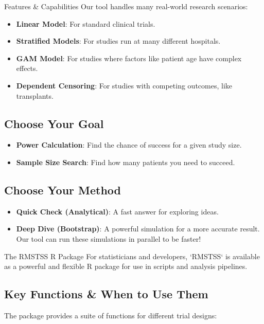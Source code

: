 \documentclass[a0,landscape]{a0poster}
\begin{document}
\begin{multicols}{3}
\begin{posterbox}{Features \& Capabilities}
    Our tool handles many real-world research scenarios:
    \begin{itemize} \itemsep=0.75em
        \item \textbf{Linear Model}: For standard clinical trials.
        \item \textbf{Stratified Models}: For studies run at many different hospitals.
        \item \textbf{GAM Model}: For studies where factors like patient age have complex effects.
        \item \textbf{Dependent Censoring}: For studies with competing outcomes, like transplants.
    \end{itemize}

    \subsection*{ Choose Your Goal}
    
    \begin{itemize} \itemsep=0.75em
        \item \textbf{Power Calculation}: Find the chance of success for a given study size.
        \item \textbf{Sample Size Search}: Find how many patients you need to succeed.
    \end{itemize}

    \subsection*{ Choose Your Method}
    
    \begin{itemize} \itemsep=0.75em
        \item \textbf{Quick Check (Analytical)}: A fast answer for exploring ideas.
        \item \textbf{Deep Dive (Bootstrap)}: A powerful simulation for a more accurate result. Our tool can run these simulations in parallel to be faster!
    \end{itemize}
\end{posterbox}

\columnbreak


\begin{posterbox}{The RMSTSS R Package}
    \huge
    For statisticians and developers, `RMSTSS` is available as a powerful and flexible R package for use in scripts and analysis pipelines.
    
    \subsection*{\huge Key Functions \& When to Use Them}
    \Large
    The package provides a suite of functions for different trial designs:
    

\end{posterbox}
\end{multicols}
\end{document}
